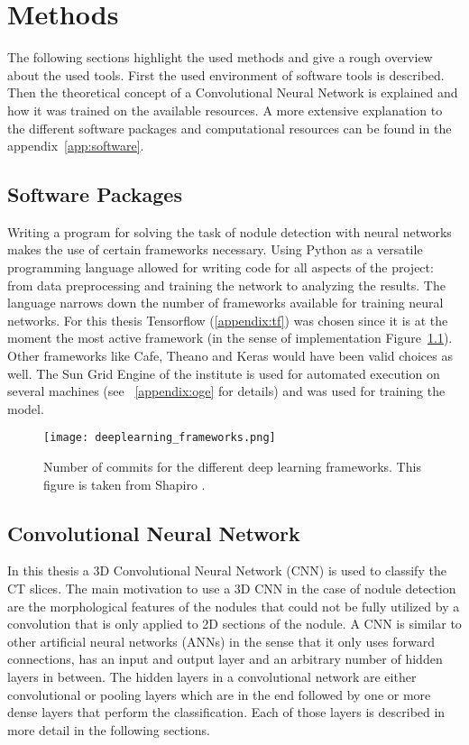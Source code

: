 \documentclass[main.tex]{subfiles}
\begin{document}
\chapter{Methods}\label{chap:methods}
The following sections highlight the used methods and give a rough overview about the used tools. First the used environment of software tools is described. Then the theoretical concept of a Convolutional Neural Network is explained and how it was trained on the available resources. A more extensive explanation to the different software packages and computational resources can be found in the appendix~\ref{app:software}.

\section{Software Packages}
Writing a program for solving the task of nodule detection with neural networks makes the use of certain frameworks necessary. Using Python as a versatile programming language allowed for writing code for all aspects of the project: from data preprocessing and training the network to analyzing the results. The language narrows down the number of frameworks available for training neural networks. For this thesis Tensorflow (\ref{appendix:tf}) was chosen since it is at the moment the most active framework (in the sense of implementation  Figure~\ref{fig:frameworks}). Other frameworks like Cafe, Theano and Keras would have been valid choices as well. The Sun Grid Engine of the institute is used for automated execution on several machines (see ~\ref{appendix:oge} for details) and was used for training the model.

\begin{figure}
\begin{center}
\texttt{[image: deeplearning\_frameworks.png]}
\end{center}
\caption{Number of commits for the different deep learning frameworks. This figure is taken from Shapiro \cite{shapiro2017}.}
\label{fig:frameworks}
\end{figure}



\section{Convolutional Neural Network}
In this thesis a 3D Convolutional Neural Network (CNN) is used to classify the CT slices. The main motivation to use a 3D CNN in the case of nodule detection are the morphological features of the nodules that could not be fully utilized by a convolution that is only applied to 2D sections of the nodule. A CNN is similar to other artificial neural networks (ANNs) in the sense that it only uses forward connections, has an input and output layer and an arbitrary number of hidden layers in between. The hidden layers in a convolutional network are either convolutional or pooling layers which are in the end followed by one or more dense layers that perform the classification. Each of those layers is described in more detail in the following sections.
\end{document}
